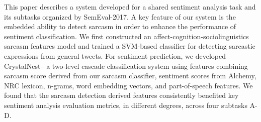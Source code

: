 This paper describes a system developed for a shared sentiment analysis task and its subtasks organized by SemEval-2017. A key feature of our system is the embedded ability to detect sarcasm in order to enhance the performance of sentiment classification. We first constructed an affect-cognition-sociolinguistics sarcasm features model and trained a SVM-based classifier for detecting sarcastic expressions from general tweets. For sentiment prediction, we developed CrystalNest-- a two-level cascade classification system using features combining sarcasm score derived from our sarcasm classifier, sentiment scores from Alchemy, NRC lexicon, n-grams, word embedding vectors, and part-of-speech features. We found that the sarcasm detection derived features consistently benefited key sentiment analysis evaluation metrics, in different degrees, across four subtasks A-D.
